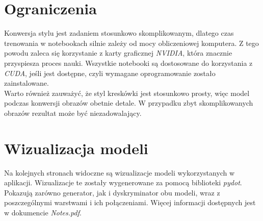\documentclass{article}
\begin{document}
\section{Ograniczenia}
Konwersja stylu jest zadaniem stosunkowo skomplikowanym, dlatego czas trenowania w notebookach silnie zależy od mocy obliczeniowej komputera. Z tego powodu zaleca się korzystanie z karty graficznej \textit{NVIDIA}, która znacznie przyspiesza proces nauki. Wszystkie notebooki są dostosowane do korzystania z \textit{CUDA}, jeśli jest dostępne, czyli wymagane oprogramowanie zostało zainstalowane.
\vspace{3mm} \\
Warto również zauważyć, że styl kreskówki jest stosunkowo prosty, więc model podczas konwersji obrazów obetnie detale. W przypadku zbyt skomplikowanych obrazów rezultat może być niezadowalający.

\section{Wizualizacja modeli}
Na kolejnych stronach widoczne są wizualizacje modeli wykorzystanych w aplikacji. Wizualizacje te zostały wygenerowane za pomocą biblioteki \textit{pydot}. Pokazują zarówno generator, jak i dyskryminator obu modeli, wraz z poszczególnymi warstwami i ich połączeniami. Więcej informacji dostępnych jest w dokumencie \textit{Notes.pdf}.
\newpage
\end{document}
